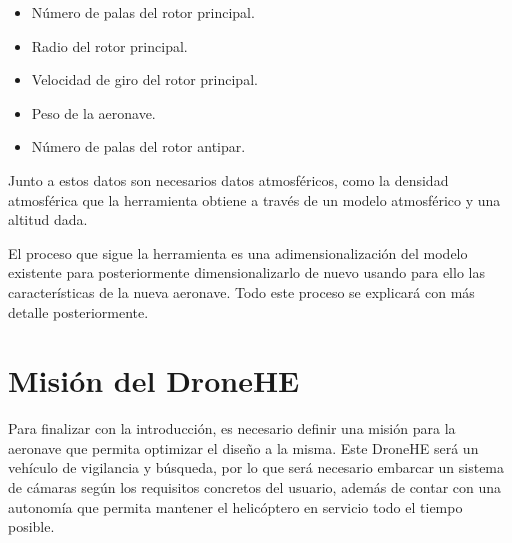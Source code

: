 \begin{itemize}
	\item Número de palas del rotor principal.
	\item Radio del rotor principal.
	\item Velocidad de giro del rotor principal.
	\item Peso de la aeronave.
	\item Número de palas del rotor antipar.
\end{itemize}

Junto a estos datos son necesarios datos atmosféricos, como la densidad atmosférica que la herramienta obtiene a través de un modelo atmosférico y una altitud dada.

El proceso que sigue la herramienta es una adimensionalización del modelo existente para posteriormente dimensionalizarlo de nuevo usando para ello las características de la nueva aeronave. Todo este proceso se explicará con más detalle posteriormente.

\section{Misión del DroneHE}

Para finalizar con la introducción, es necesario definir una misión para la aeronave que permita optimizar el diseño a la misma.
Este DroneHE será un vehículo de vigilancia y búsqueda, por lo que será necesario embarcar un sistema de cámaras según los requisitos concretos del usuario, además de contar con una autonomía que permita mantener el helicóptero en servicio todo el tiempo posible.

